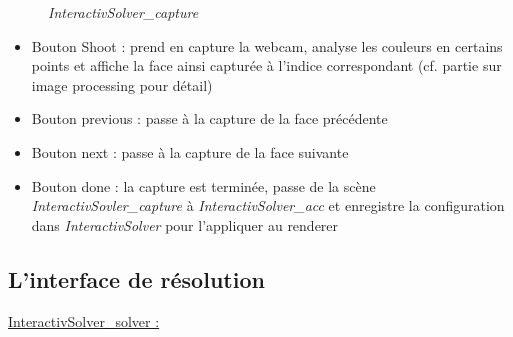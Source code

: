 \begin{figure}[H]
\begin{center}
\end{center}
	\caption{ \textit{InteractivSolver\_capture}}
\end{figure}

\begin{itemize}
    \item Bouton Shoot : prend en capture la webcam, analyse les couleurs en certains points et affiche la face ainsi capturée à l’indice correspondant (cf. partie sur image processing pour détail)
    \item Bouton previous : passe à la capture de la face précédente
    \item Bouton next : passe à la capture de la face suivante
    \item Bouton done : la capture est terminée, passe de la scène \textit{InteractivSovler\_capture} à \textit{InteractivSolver\_acc} et enregistre la configuration dans \textit{InteractivSolver} pour l'appliquer au renderer
\end{itemize}

\subsection{L'interface de résolution}
\underline{InteractivSolver\_solver :}

